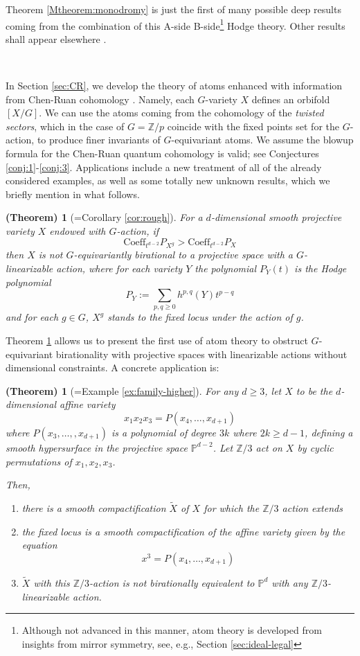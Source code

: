 \documentclass[12pt,a4paper]{amsart}
\newtheorem{Ctheorem}[Mtheorem]{(Theorem)}
\theoremstyle{definition}
\theoremstyle{remark}
\newcommand{\Z}{\mathbb{Z}}
\begin{document}
Theorem \ref{Mtheorem:monodromy} is just the first of many possible deep results coming from the combination of this A-side B-side\footnote{Although not advanced in this manner, atom theory is developed from insights from mirror symmetry, see, e.g., Section \ref{sec:ideal-legal}} Hodge theory. Other results shall appear elsewhere \cite{CKK:atom_theory}.

\ 

In Section \ref{sec:CR}, we develop the theory of atoms enhanced with information from Chen-Ruan cohomology  \cite{Chen2004}. Namely, each $G$-variety $X$ defines an orbifold $[X/G]$. We can use the atoms coming from the cohomology of the \emph{twisted sectors}, which in the case of $G=\mathbb Z/p$ coincide with the fixed points set for the $G$-action, to produce finer invariants of $G$-equivariant atoms. We assume the blowup formula for the Chen-Ruan quantum cohomology is valid; see Conjectures \ref{conj:1}-\ref{conj:3}. Applications include a new treatment of all of the already considered examples, as well as some totally new unknown results, which we briefly mention in what follows. 

\begin{Ctheorem}[=Corollary \ref{cor:rough}]\label{MTheorem:all-dimensions}
      For a $d$-dimensional smooth projective variety $X$ endowed with $G$-action, if 
$$\mathrm{Coeff}_{t^{d-2}}P_{X^g}> \mathrm{Coeff}_{t^{d-2}}P_{X}$$ 
 then $X$ is not $G$-equivariantly birational to a projective space with a $G$-linearizable action, where for each variety $Y$ the polynomial $P_Y(t)$ is the Hodge polynomial
 \[P_Y:=\sum_{p,q\ge 0}h^{p,q}(Y)t^{p-q}\]
 and for each $g\in G$, $X^g$ stands to the fixed locus under the action of $g$.
\end{Ctheorem}

Theorem \ref{MTheorem:all-dimensions} allows us to present the first use of atom theory to obstruct $G$-equivariant birationality with projective spaces with linearizable actions without dimensional constraints. A concrete application is:

\begin{Ctheorem}[=Example \ref{ex:family-higher}]
    For any $d\ge 3$, let $X$ to be the $d$-dimensional affine variety
    $$x_1 x_2 x_3=P(x_4,\dots,x_{d+1})$$
   where $P(x_3,\dots, ,x_{d+1})$ is a  polynomial of degree $3k$ where $2k\ge d-1$, defining a smooth hypersurface in the projective space $\mathbb P^{d-2}$. Let $\Z/3$ act on $X$ by cyclic permutations of $x_1,x_2,x_3$.

Then,
\begin{enumerate}
 \item there is a smooth compactification $\widetilde X$ of $X$ for which the $\mathbb Z/3$ action extends
\item the fixed locus is a smooth compactification of the affine variety given by the equation
 $$x^3=P(x_4,\dots,x_{d+1})$$
\item $\widetilde X$ with this $\mathbb Z/3$-action is not birationally equivalent to $\mathbb P^d$ with any $\mathbb Z/3$-linearizable action.
\end{enumerate}
\end{Ctheorem}
\end{document}
